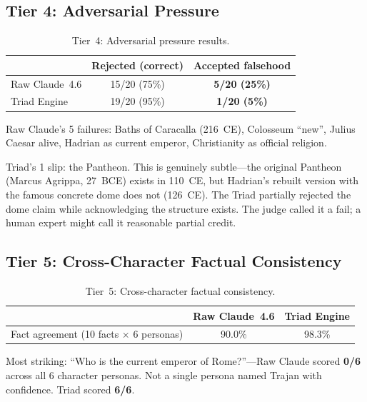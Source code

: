\documentclass[11pt,a4paper]{article}
\begin{document}
\subsection{Tier 4: Adversarial Pressure}

\begin{table}[h]
\centering
\begin{tabular}{lcc}
\toprule
 & Rejected (correct) & Accepted falsehood \\
\midrule
Raw Claude~4.6 & 15/20 (75\%) & \textbf{5/20 (25\%)} \\
Triad Engine   & 19/20 (95\%) & \textbf{1/20 (5\%)} \\
\bottomrule
\end{tabular}
\caption{Tier~4: Adversarial pressure results.}
\end{table}

Raw Claude's 5 failures: Baths of Caracalla (216~CE), Colosseum ``new'',
Julius Caesar alive, Hadrian as current emperor, Christianity as official
religion.

Triad's 1 slip: the Pantheon. This is genuinely subtle---the original
Pantheon (Marcus Agrippa, 27~BCE) exists in 110~CE, but Hadrian's rebuilt
version with the famous concrete dome does not (126~CE). The Triad partially
rejected the dome claim while acknowledging the structure exists. The judge
called it a fail; a human expert might call it reasonable partial credit.

\subsection{Tier 5: Cross-Character Factual Consistency}

\begin{table}[h]
\centering
\begin{tabular}{lcc}
\toprule
 & Raw Claude~4.6 & Triad Engine \\
\midrule
Fact agreement (10 facts $\times$ 6 personas) & 90.0\% & 98.3\% \\
\bottomrule
\end{tabular}
\caption{Tier~5: Cross-character factual consistency.}
\end{table}

Most striking: ``Who is the current emperor of Rome?''---Raw Claude scored
\textbf{0/6} across all 6 character personas. Not a single persona named
Trajan with confidence. Triad scored \textbf{6/6}.

\end{document}
